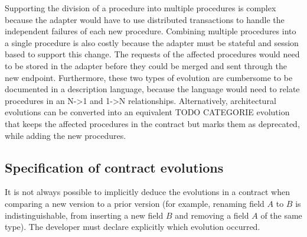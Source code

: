 Supporting the division of a procedure into multiple procedures is complex because the adapter would have to use distributed transactions to handle the independent failures of each new procedure.
Combining multiple procedures into a single procedure is also costly because the adapter must be stateful and session based to support this change.
The requests of the affected procedures would need to be stored in the adapter before they could be merged and sent through the new endpoint.
Furthermore, these two types of evolution are cumbersome to be documented in a description language, because the language would need to relate procedures in an N->1 and 1->N relationships.
Alternatively, architectural evolutions can be converted into an equivalent TODO CATEGORIE evolution that keeps the affected procedures in the contract but marks them as deprecated, while adding the new procedures.

\subsection{Specification of contract evolutions} %
\label{sec:evolution_specification}

It is not always possible to implicitly deduce the evolutions in a contract when comparing a new version to a prior version
(for example, renaming field $A$ to $B$ is indistinguishable, from inserting a new field $B$ and removing a field $A$ of the same type).
The developer must declare explicitly which evolution occurred.


